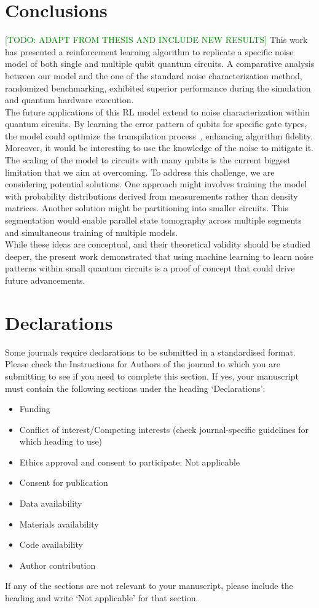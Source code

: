 \documentclass[referee,sn-basic]{sn-jnl} %
\newcommand{\todo}[1]{\textcolor{green}{[TODO: #1]}}
\begin{document}
\section{Conclusions}
\todo{ADAPT FROM THESIS AND INCLUDE NEW RESULTS}
This work has presented a reinforcement learning algorithm to replicate a specific noise model of both single and multiple qubit quantum circuits. A comparative analysis between our model and the one of the standard noise characterization method, randomized benchmarking, exhibited superior performance during the simulation and quantum hardware execution.\\
The future applications of this RL model extend to noise characterization within quantum circuits. By learning the error pattern of qubits for specific gate types, the model could optimize the transpilation process~\cite{9259930}, enhancing algorithm fidelity. Moreover, it would be interesting to use the knowledge of the noise to mitigate it.
The scaling of the model to circuits with many qubits is the current biggest limitation that we aim at overcoming. To address this challenge, we are considering potential solutions. One approach might involves training the model with probability distributions derived from measurements rather than density matrices. Another solution might be partitioning into smaller circuits. This segmentation would enable parallel state tomography across multiple segments and simultaneous training of multiple models.\\
While these ideas are conceptual, and their theoretical validity should be studied deeper, the present work demonstrated that using machine learning to learn noise patterns within small quantum circuits is a proof of concept that could drive future advancements.

\backmatter

\section*{Declarations}

Some journals require declarations to be submitted in a standardised format. Please check the Instructions for Authors of the journal to which you are submitting to see if you need to complete this section. If yes, your manuscript must contain the following sections under the heading `Declarations':

\begin{itemize}
\item Funding
\item Conflict of interest/Competing interests (check journal-specific guidelines for which heading to use)
\item Ethics approval and consent to participate: Not applicable
\item Consent for publication
\item Data availability 
\item Materials availability
\item Code availability 
\item Author contribution
\end{itemize}

\noindent
If any of the sections are not relevant to your manuscript, please include the heading and write `Not applicable' for that section. 


\end{document}
